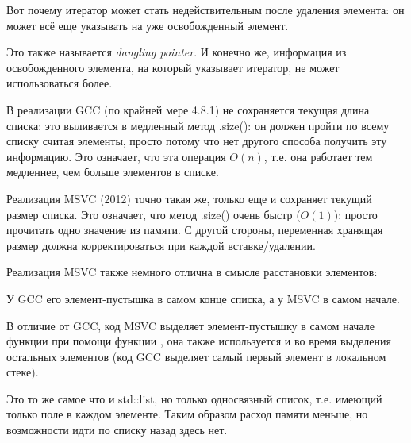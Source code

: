 Вот почему итератор может стать недействительным после удаления элемента:
он может всё еще указывать на уже освобожденный элемент.

Это также называется \emph{dangling pointer}.
И конечно же, информация из освобожденного элемента, на который указывает итератор, 
не может использоваться более.

В реализации GCC (по крайней мере 4.8.1) не сохраняется текущая длина списка: это выливается в медленный
метод .size(): он должен пройти по всему списку считая элементы, просто потому что нет
другого способа получить эту информацию.
Это означает, что эта операция $O(n)$, т.е. она работает тем медленнее, чем больше элементов в списке.





\label{MSVC_std_list}

Реализация MSVC (2012) точно такая же, только еще и сохраняет текущий размер списка.
Это означает, что метод .size() очень быстр ($O(1)$): просто прочитать одно значение из памяти.
С другой стороны, переменная хранящая размер должна корректироваться при каждой вставке/удалении.

Реализация MSVC также немного отлична в смысле расстановки элементов:



У GCC его элемент-пустышка в самом конце списка, а у MSVC в самом начале.



В отличие от GCC, код MSVC выделяет элемент-пустышку в самом начале функции при помощи
функции , она также используется и во время выделения остальных элементов
(код GCC выделяет самый первый элемент в локальном стеке).




Это то же самое что и std::list, но только односвязный список, т.е. имеющий только поле  в каждом
элементе.
Таким образом расход памяти меньше, но возможности идти по списку назад здесь нет.

